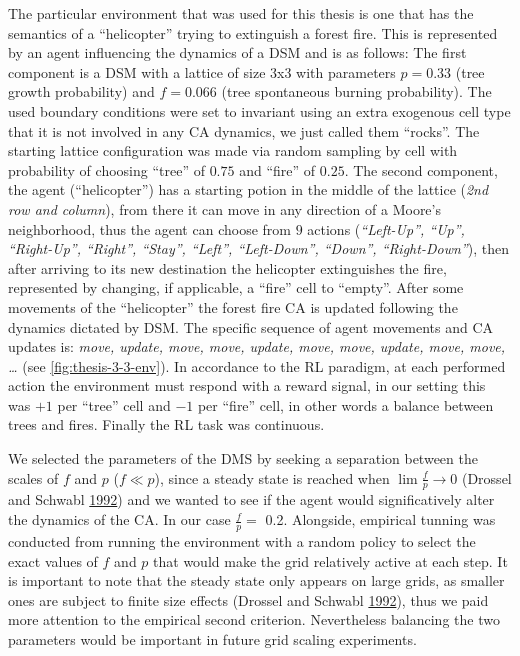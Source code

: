 \documentclass[
  openany]{book}
\begin{document}
The particular environment that was used for this thesis is one that has the semantics of a ``helicopter'' trying to extinguish a forest fire. This is represented by an agent influencing the dynamics of a DSM and is as follows: The first component is a DSM with a lattice of size 3x3 with parameters \(p=0.33\) (tree growth probability) and \(f=0.066\) (tree spontaneous burning probability). The used boundary conditions were set to invariant using an extra exogenous cell type that it is not involved in any CA dynamics, we just called them ``rocks''. The starting lattice configuration was made via random sampling by cell with probability of choosing ``tree'' of \(0.75\) and ``fire'' of \(0.25\). The second component, the agent (``helicopter'') has a starting potion in the middle of the lattice (\emph{2nd row and column}), from there it can move in any direction of a Moore's neighborhood, thus the agent can choose from \(9\) actions (\emph{``Left-Up'', ``Up'', ``Right-Up'', ``Right'', ``Stay'', ``Left'', ``Left-Down'', ``Down'', ``Right-Down''}), then after arriving to its new destination the helicopter extinguishes the fire, represented by changing, if applicable, a ``fire'' cell to ``empty''. After some movements of the ``helicopter'' the forest fire CA is updated following the dynamics dictated by DSM. The specific sequence of agent movements and CA updates is: \emph{move, update, move, move, update, move, move, update, move, move, \ldots{}} (see \ref{fig:thesis-3-3-env}). In accordance to the RL paradigm, at each performed action the environment must respond with a reward signal, in our setting this was \(+1\) per ``tree'' cell and \(-1\) per ``fire'' cell, in other words a balance between trees and fires. Finally the RL task was continuous.

We selected the parameters of the DMS by seeking a separation between the scales of \(f\) and \(p\) (\(f \ll p\)), since a steady state is reached when \(\lim \frac {f}{p} \to 0\) (Drossel and Schwabl \protect\hyperlink{ref-drossel1992self}{1992}) and we wanted to see if the agent would significatively alter the dynamics of the CA. In our case \(\frac {f}{p}=\) 0.2. Alongside, empirical tunning was conducted from running the environment with a random policy to select the exact values of \(f\) and \(p\) that would make the grid relatively active at each step. It is important to note that the steady state only appears on large grids, as smaller ones are subject to finite size effects (Drossel and Schwabl \protect\hyperlink{ref-drossel1992self}{1992}), thus we paid more attention to the empirical second criterion. Nevertheless balancing the two parameters would be important in future grid scaling experiments.
\end{document}

